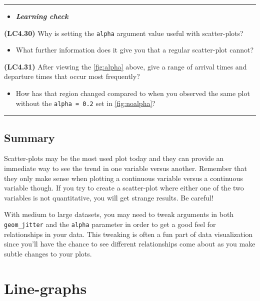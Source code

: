 \documentclass[]{tufte-book}
\providecommand{\tightlist}{%
  \setlength{\itemsep}{0pt}\setlength{\parskip}{0pt}}
\newenvironment{rmdblock}[1]
  {\begin{shaded*}
  \begin{itemize}
  \renewcommand{\labelitemi}{
    \raisebox{-.7\height}[0pt][0pt]{
    }
  }
  \item
  }
  {
  \end{itemize}
  \end{shaded*}
  }
\newenvironment{learncheck}
  {\begin{rmdblock}{warning}}
  {\end{rmdblock}}
\begin{document}
\begin{center}\rule{\linewidth}{\linethickness}\end{center}

\begin{learncheck}
\textbf{\emph{Learning check}}
\end{learncheck}

\textbf{(LC4.30)} Why is setting the \texttt{alpha} argument value
useful with scatter-plots?

\begin{itemize}
\tightlist
\item
  What further information does it give you that a regular scatter-plot
  cannot?
\end{itemize}

\textbf{(LC4.31)} After viewing the \ref{fig:alpha} above, give a range
of arrival times and departure times that occur most frequently?

\begin{itemize}
\tightlist
\item
  How has that region changed compared to when you observed the same
  plot without the \texttt{alpha\ =\ 0.2} set in \ref{fig:noalpha}?
\end{itemize}

\begin{center}\rule{\linewidth}{\linethickness}\end{center}

\subsection{Summary}\label{summary-3}

Scatter-plots may be the most used plot today and they can provide an
immediate way to see the trend in one variable versus another. Remember
that they only make sense when plotting a continuous variable versus a
continuous variable though. If you try to create a scatter-plot where
either one of the two variables is not quantitative, you will get
strange results. Be careful!

With medium to large datasets, you may need to tweak arguments in both
\texttt{geom\_jitter} and the \texttt{alpha} parameter in order to get a
good feel for relationships in your data. This tweaking is often a fun
part of data visualization since you'll have the chance to see different
relationships come about as you make subtle changes to your plots.

\section{Line-graphs}\label{line-graphs}
\end{document}
